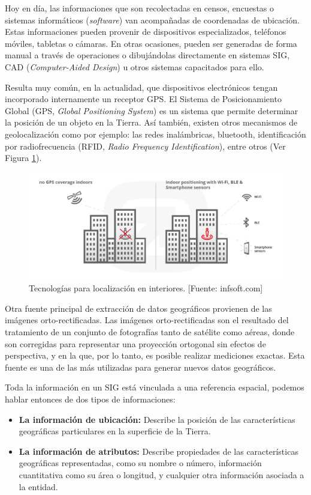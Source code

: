 Hoy en día, las informaciones que son recolectadas en censos, encuestas o sistemas informáticos (\textit{software}) van acompañadas de coordenadas de ubicación. Estas informaciones pueden provenir de dispositivos especializados, teléfonos móviles, tabletas o cámaras. En otras ocasiones, pueden ser generadas de forma manual a través de operaciones o dibujándolas directamente en sistemas SIG, CAD (\textit{Computer-Aided Design}) u otros sistemas capacitados para ello.

Resulta muy común, en la actualidad, que dispositivos electrónicos tengan incorporado internamente un receptor GPS. El Sistema de Posicionamiento Global (GPS, \textit{Global Positioning System}) es un sistema que permite determinar la posición de un objeto en la Tierra. Así también, existen otros mecanismos de geolocalización como por ejemplo: las redes inalámbricas, bluetooth, identificación por radiofrecuencia (RFID, \textit{Radio Frequency Identification}), entre otros (Ver Figura \ref{fig:interioresTech}).

\begin{figure}[H]
    \centering
    \includegraphics[width=14.5cm]{Indoor_tech.jpg}
    \caption{Tecnologías para localización en interiores. [Fuente: infsoft.com]}
    \label{fig:interioresTech}
\end{figure}

Otra fuente principal de extracción de datos geográficos provienen de las imágenes orto-rectificadas. Las imágenes orto-rectificadas son el resultado del tratamiento de un conjunto de fotografías tanto de satélite como aéreas, donde son corregidas para representar una proyección ortogonal sin efectos de perspectiva, y en la que, por lo tanto, es posible realizar mediciones exactas. Esta fuente es una de las más utilizadas para generar nuevos datos geográficos.

Toda la información en un SIG está vinculada a una referencia espacial, podemos hablar entonces de dos tipos de informaciones: 
\begin{itemize}
    \item \textbf{La información de ubicación:} 
    Describe la posición de las características geográficas particulares en la superficie de la Tierra.
    \item \textbf{La información de atributos:} 
    Describe propiedades de las características geográficas representadas, como su nombre o número, información cuantitativa como su área o longitud, y cualquier otra información asociada a la entidad.
\end{itemize}

